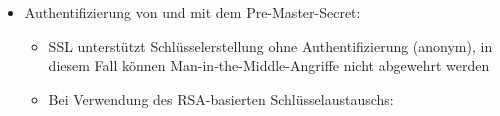 \documentclass[a4paper]{article}
\begin{document}
\begin{multicols}{3}
\begin{itemize}
              \begin{itemize}
                  \item
                        client\_write\_MAC\_secret = key\_block{[}1,
                        CipherSpec.hash\_size{]}
                  \item
                        server\_write\_MAC\_secret = key\_block{[}i 1 , i 1 +
                        CipherSpec.hash\_size - 1{]}
                  \item
                        client\_write\_key = key\_block{[}i 2 , i 2 +
                        CipherSpec.key\_material - 1{]}
                  \item
                        server\_write\_key = key\_block{[}i 3 , i 3 +
                        CipherSpec.key\_material - 1{]}
                  \item
                        client\_write\_IV = key\_block{[}i 4 , i 4 + CipherSpec.IV\_size -
                        1{]}
                  \item
                        server\_write\_IV = key\_block{[}i 5 , i 5 + CipherSpec.IV\_size -
                        1{]}
              \end{itemize}
        \item
              Authentifizierung von und mit dem Pre-Master-Secret:

              \begin{itemize}
                  \item
                        SSL unterstützt Schlüsselerstellung ohne Authentifizierung (anonym),
                        in diesem Fall können Man-in-the-Middle-Angriffe nicht abgewehrt
                        werden
                  \item
                        Bei Verwendung des RSA-basierten Schlüsselaustauschs:


\end{itemize}
\end{itemize}
\end{multicols}
\end{document}
